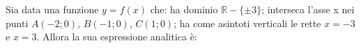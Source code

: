 Sia data una funzione $y=f(x)$ che: ha dominio $\mathbb{R}-\{\pm 3\}$; interseca l’asse x nei punti $A(-2;0)$, $B(-1;0)$, $C(1;0)$; ha come asintoti verticali le rette $x=-3$ e $x=3$.
Allora la sua espressione analitica è:
